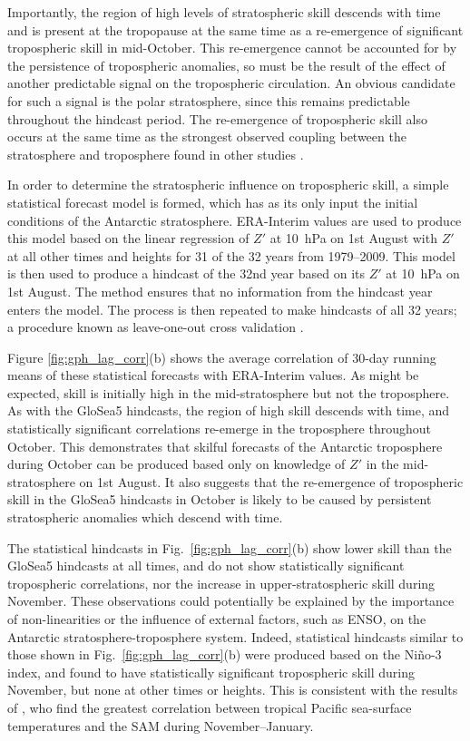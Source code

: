 Importantly, the region of high levels of stratospheric skill descends with time
and is present at the tropopause at the same time as a re-emergence of
significant tropospheric skill in mid-October. This re-emergence cannot be
accounted for by the persistence of tropospheric anomalies, so must be the
result of the effect of another predictable signal on the tropospheric
circulation. An obvious candidate for such a signal is the polar stratosphere,
since this remains predictable throughout the hindcast period. The re-emergence
of tropospheric skill also occurs at the same time as the strongest observed
coupling between the stratosphere and troposphere found in other studies
\citep[e.g.,][]{Thompson2005, Simpson2011}.

In order to determine the stratospheric influence on tropospheric skill, a
simple statistical forecast model is formed, which has as its only input the
initial conditions of the Antarctic stratosphere. ERA-Interim values are used to
produce this model based on the linear regression of $Z'$ at 10~hPa on 1st
August with $Z'$ at all other times and heights for 31 of the 32 years from
1979--2009. This model is then used to produce a hindcast of the 32nd year based
on its $Z'$ at 10~hPa on 1st August. The method ensures that no information from
the hindcast year enters the model. The process is then repeated to make
hindcasts of all 32 years; a procedure known as leave-one-out cross validation
\citep{Wilks}.

Figure \ref{fig:gph_lag_corr}(b) shows the average correlation of 30-day running
means of these statistical forecasts with ERA-Interim values. As might be
expected, skill is initially high in the mid-stratosphere but not the
troposphere. As with the GloSea5 hindcasts, the region of high skill descends
with time, and statistically significant correlations re-emerge in the
troposphere throughout October. This demonstrates that skilful forecasts of the
Antarctic troposphere during October can be produced based only on knowledge of
$Z'$ in the mid-stratosphere on 1st August. It also suggests that the
re-emergence of tropospheric skill in the GloSea5 hindcasts in October is likely
to be caused by persistent stratospheric anomalies which descend with time.

The statistical hindcasts in Fig.\ \ref{fig:gph_lag_corr}(b) show lower skill
than the GloSea5 hindcasts at all times, and do not show statistically
significant tropospheric correlations, nor the increase in upper-stratospheric
skill during November. These observations could potentially be explained by the
importance of non-linearities or the influence of external factors, such as
ENSO, on the Antarctic stratosphere-troposphere system. Indeed, statistical
hindcasts similar to those shown in Fig.\ \ref{fig:gph_lag_corr}(b) were
produced based on the Ni\~no-3 index, and found to have statistically
significant tropospheric skill during November, but none at other times or
heights. This is consistent with the results of \citet{Lim2013}, who find the
greatest correlation between tropical Pacific sea-surface temperatures and the
SAM during November--January.

